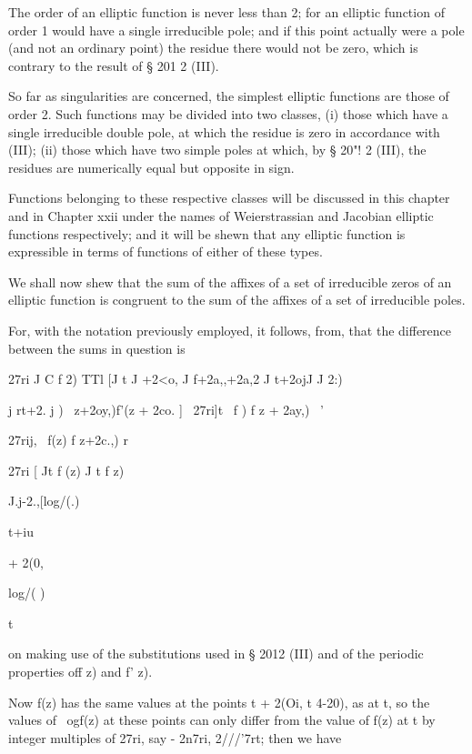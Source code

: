 The order of an elliptic function is never less than 2; for an
elliptic function of order 1 would have a single irreducible pole;
and if this point actually were a pole (and not an ordinary point) the
residue there would not be zero, which is contrary to the result of §
201 2 (III).

So far as singularities are concerned, the simplest elliptic functions
are those of order 2. Such functions may be divided into two classes,
(i) those which have a single irreducible double pole, at which the
residue is zero in accordance with (III); (ii) those which
have two simple poles at which, by § 20"! 2 (III), the residues are
numerically equal but opposite in sign.

Functions belonging to these respective classes will be discussed in
this chapter and in Chapter xxii under the names of Weierstrassian and
Jacobian elliptic functions respectively; and it will be shewn that
any elliptic function is expressible in terms of functions of either
of these types.

%
%


We shall now shew that the sum of the affixes of a set of irreducible
zeros of an elliptic function is congruent to the sum of the affixes
of a set of irreducible poles.

For, with the notation previously employed, it follows, from,
that the difference between the sums in question is

27ri J C f 2) TTl [J t J +2<o, J f+2a,,+2a,2 J t+2ojJ J 2:)

  j rt+2. j ) \ z+2oy,)f'(z + 2co. ] ~27ri]t \ f ) f z + 2ay,) \ '

27rij, \ f(z) f z+2c.,) r

27ri [ Jt f (z) J t f z)

J.j-2.,[log/(.)

t+iu

+ 2(0,

log/( )

t

on making use of the substitutions used in § 2012 (III) and of the
periodic properties off z) and f' z).

Now f(z) has the same values at the points t + 2(Oi, t 4-20), as at t,
so the values of \ ogf(z) at these points can only differ from the
value of f(z) at t by integer multiples of 27ri, say - 2n7ri,
2///'7rt; then we have


